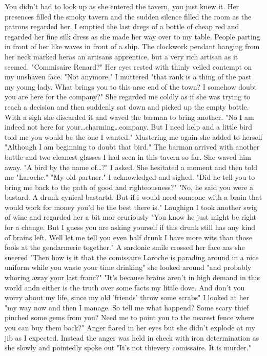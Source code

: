 You didn't had to look up as she entered the tavern, you just knew it. Her presences filled the smoky tavern and the sudden silence filled the room as the patrons regarded her. I emptied the last dregs of a bottle of cheap red and regarded her fine silk dress as she made her way over to my table. People parting in front of her like waves in front of a ship. The clockwork pendant hanging from her neck marked heras an artisans apprentice, but a very rich artisan as it seemed. "Commisaire Renard?" Her eyes rested with thinly veiled contempt on my unshaven face. "Not anymore." I muttered "that rank is a thing of the past my young lady. What brings you to this arse end of the town? I somehow doubt you are here for the company?" She regarded me coldly as if she was trying to reach a decision and then suddenly sat down and picked up the empty bottle. With a sigh she discarded it and waved the barman to bring another. "No I am indeed not here for your\dots charming\dots company. But I need help and a little bird told me you would be the one I wanted." Mustering me again she added to herself "Although I am beginning to doubt that bird." The barman arrived with another battle and two cleanest glasses I had seen in this tavern so far. She waved him away. "A bird by the name of\dots?" I asked. She hesitated a moment and then told me "Laroche." "My old partner." I acknowledged and sighed. "Did he tell you to bring me back to the path of good and righteousness?" "No, he said you were a bastard. A drunk cynical bastartd. But if i would need someone with a brain that would work for money you'd be the best there is." Laughign I took another swig of wine and regarded her a bit mor ecuriously "You know he just might be right for a change. But I guess you are asking yourself if this drunk still has any kind of brains left. Well let me tell you even half drunk I have more wits than those fools at the gendarmerie together." A sardonic smile crossed her face aas she sneered "Then how is it that the comissaire Laroche is parading around in a nice uniform while you waste your time drinking" she looked around "and probably whoring away your last franc?" "It's because brains aren't in high demand in this world andn either is the truth over some facts my little dove.  And don't you worry about my life, since my old 'friends' throw some scrabs" I looked at her "my way now and then I manage. So tell me what happend? Some scary thief pinched some gems from you? Need me to point you to the nearest fence where you can buy them back?" Anger flared in her eyes but she didn't explode at my jib as I expected. Instead the anger was held in check with iron determination as she slowly and pointedly spoke out "It's not thievery comissaire. It is murder."

\newscene

